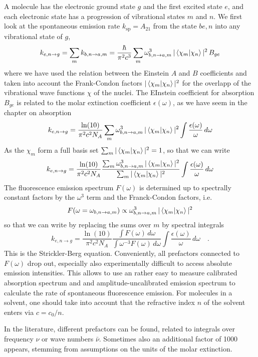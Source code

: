 A molecule has the electronic ground state $g$ and the first excited state $e$, and each electronic state has a progression of vibrational states $m$ and $n$. We first look at the spontaneous emission rate  $k_{\text{sp}} =  A_{21}$
from the state $be,n$ into any vibrational state of $g$, 
%
\[
k_{e,n \rightarrow g}  = \sum_m  k_{b,n \rightarrow a,m}  = \frac{\hbar}{\pi^2 c^3} \sum_m  \omega_{b,n \rightarrow a,m}^3 \,  | \braket{\chi_m |  \chi_n} |^2 \, B_{ge} 
\]
where we have used the relation between the Einstein $A$ and $B$ coefficients and taken into account the Frank-Condon factors $ | \braket {\chi_m | \chi_n} |^2 $ for the overlapp of the vibrational wave functions $\chi$ of the nuclei.
%
The EInstein coefficient for absorption $B_{ge} $ is related to the molar extinction coefficient $\epsilon(\omega)$, as we have seem in the chapter on absorption
\[
 k_{e,n \rightarrow g}  = \frac{\ln(10)}{\pi^2 c^2 N_A} \sum_m  \omega_{b,n \rightarrow a,m}^3 \,  | \braket{\chi_m |  \chi_n} |^2
 \int \frac{\epsilon(\omega)}{\omega} \, d \omega
\]
%
As the  $\chi_m$ form a full basis set $\sum_m  | \braket {\chi_m | \chi_n} |^2 = 1$, so that we can write
\[
 k_{e,n \rightarrow g}  = \frac{\ln(10)}{\pi^2 c^2 N_A} 
%
\frac{ 
 \sum_m  \omega_{b,n \rightarrow a,m}^3 \,  | \braket{\chi_m |  \chi_n} |^2 }
 { \sum_m  | \braket {\chi_m | \chi_n} |^2 }
 \int \frac{\epsilon(\omega)}{\omega} \, d \omega
\]
The fluorescence emission spectrum $F(\omega)$ is determined up to spectrally constant factors by the $\omega^3$ term and the Franck-Condon factors, i.e.
\[
 F(\omega =  \omega_{b,n \rightarrow a,m} )  \propto  \omega_{b,n \rightarrow a,m}^3 \,  | \braket{\chi_m |  \chi_n} |^2 
\]
so that we can write by replacing the sums over $m$ by  spectral integrals
\[
 k_{e,n \rightarrow g}  =  \frac{\ln(10)}{\pi^2 c^2 N_A} \frac{\int F(\omega) \, d \omega}{\int \omega^{-3} F(\omega) \, d \omega }
 \int \frac{\epsilon(\omega)}{\omega} \, d \omega   \quad. 
\]
This is the Strickler-Berg equation. Conveniently, all prefactors connected to $F(\omega)$ drop out, especially also experimentally difficult to access absolute emission intensities. This allows to use an rather easy to measure  calibrated absorption spectrum and and amplitude-uncalibrated emission spectrum to calculate the rate of spontaneous fluorescence emission. For molecules in a solvent, one should take into account that the refractive index $n$ of the solvent enters via $c = c_0 / n$. 

In the literature, different prefactors can be found, related to integrals over frequency $\nu$ or wave numbers $\bar{\nu}$. Sometimes also an additional factor of 1000 appears, stemming from assumptions on the units of the molar extinction.














